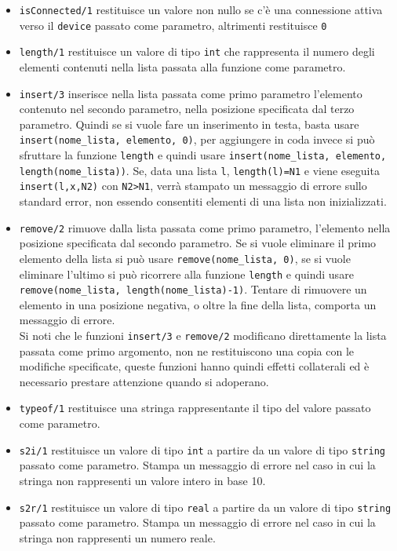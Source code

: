 \documentclass[10pt]{article}
\begin{document}
\begin{itemize}
\item \texttt{isConnected/1} restituisce un valore non nullo se c'è una connessione attiva verso il \texttt{device} passato come parametro, altrimenti restituisce \texttt{0}
\item \texttt{length/1} restituisce un valore di tipo \texttt{int} che rappresenta il numero degli elementi contenuti nella lista passata alla funzione come parametro.
\item \texttt{insert/3} inserisce nella lista passata come primo parametro l'elemento contenuto nel secondo parametro, nella posizione specificata dal terzo parametro. Quindi se si vuole fare un inserimento in testa, basta usare \texttt{insert(nome\_lista, elemento, 0)}, per aggiungere in coda invece si può sfruttare la funzione \texttt{length} e quindi usare \texttt{insert(nome\_lista, elemento, length(nome\_lista))}. 
Se, data una lista \texttt{l}, \texttt{length(l)=N1} e viene eseguita \texttt{insert(l,x,N2)} con \texttt{N2>N1}, verrà stampato un messaggio di errore sullo standard error, non essendo consentiti elementi di una lista non inizializzati.
\item \texttt{remove/2} rimuove dalla lista passata come primo parametro, l'elemento nella posizione specificata dal secondo parametro. Se si vuole eliminare il primo elemento della lista si può usare \texttt{remove(nome\_lista, 0)}, se si vuole eliminare l'ultimo si può ricorrere alla funzione \texttt{length} e quindi usare \texttt{remove(nome\_lista, length(nome\_lista)-1)}. Tentare di rimuovere un elemento in una posizione negativa, o oltre la fine della lista, comporta un messaggio di errore.\\
Si noti che le funzioni \texttt{insert/3} e \texttt{remove/2} modificano direttamente la lista passata come primo argomento, non ne restituiscono una copia con le modifiche specificate, queste funzioni hanno quindi effetti collaterali ed è necessario prestare attenzione quando si adoperano.
\item \texttt{typeof/1} restituisce una stringa rappresentante il tipo del valore passato come parametro.
\item \texttt{s2i/1} restituisce un valore di tipo \texttt{int} a partire da un valore di tipo \texttt{string} passato come parametro. Stampa un messaggio di errore nel caso in cui la stringa non rappresenti un valore intero in base 10.
\item \texttt{s2r/1} restituisce un valore di tipo \texttt{real} a partire da un valore di tipo \texttt{string} passato come parametro. Stampa un messaggio di errore nel caso in cui la stringa non rappresenti un numero reale. 

\end{itemize}
\end{document}
